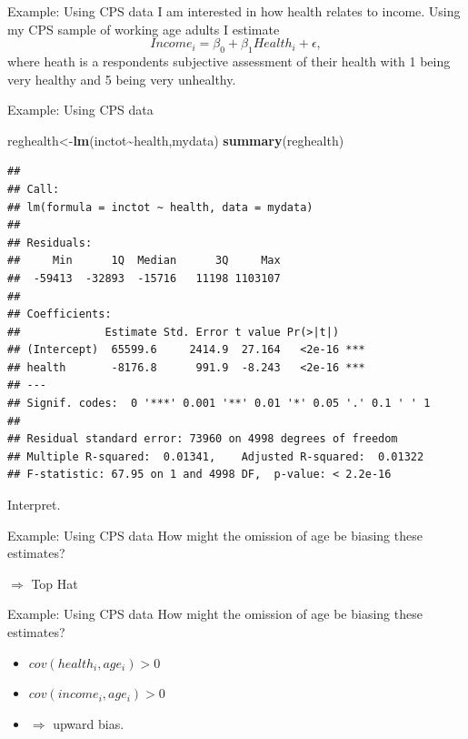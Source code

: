 \documentclass[
  ignorenonframetext,
]{beamer}
\newenvironment{Shaded}{\begin{snugshade}}{\end{snugshade}}
\newcommand{\KeywordTok}[1]{\textcolor[rgb]{0.13,0.29,0.53}{\textbf{#1}}}
\newcommand{\NormalTok}[1]{#1}
\newcommand{\OperatorTok}[1]{\textcolor[rgb]{0.81,0.36,0.00}{\textbf{#1}}}
\begin{document}
\begin{frame}{Example: Using CPS data}
\protect\hypertarget{example-using-cps-data}{}
I am interested in how health relates to income. Using my CPS sample of
working age adults I estimate \[
Income_i=\beta_0+\beta_1Health_i+\epsilon, 
\] where heath is a respondents subjective assessment of their health
with 1 being very healthy and 5 being very unhealthy.
\end{frame}

\begin{frame}[fragile]{Example: Using CPS data}
\protect\hypertarget{example-using-cps-data-1}{}
\tiny

\begin{Shaded}
\begin{Highlighting}[]
\NormalTok{reghealth\textless{}{-}}\KeywordTok{lm}\NormalTok{(inctot}\OperatorTok{\textasciitilde{}}\NormalTok{health,mydata)}
\KeywordTok{summary}\NormalTok{(reghealth)}
\end{Highlighting}
\end{Shaded}

\begin{verbatim}
## 
## Call:
## lm(formula = inctot ~ health, data = mydata)
## 
## Residuals:
##     Min      1Q  Median      3Q     Max 
##  -59413  -32893  -15716   11198 1103107 
## 
## Coefficients:
##             Estimate Std. Error t value Pr(>|t|)    
## (Intercept)  65599.6     2414.9  27.164   <2e-16 ***
## health       -8176.8      991.9  -8.243   <2e-16 ***
## ---
## Signif. codes:  0 '***' 0.001 '**' 0.01 '*' 0.05 '.' 0.1 ' ' 1
## 
## Residual standard error: 73960 on 4998 degrees of freedom
## Multiple R-squared:  0.01341,    Adjusted R-squared:  0.01322 
## F-statistic: 67.95 on 1 and 4998 DF,  p-value: < 2.2e-16
\end{verbatim}

\normalsize

Interpret.
\end{frame}

\begin{frame}{Example: Using CPS data}
\protect\hypertarget{example-using-cps-data-2}{}
How might the omission of age be biasing these estimates?

\(\Rightarrow\) Top Hat
\end{frame}

\begin{frame}{Example: Using CPS data}
\protect\hypertarget{example-using-cps-data-3}{}
How might the omission of age be biasing these estimates?

\begin{itemize}
\item
  \(cov(health_i,age_i)>0\)
\item
  \(cov(income_i,age_i)>0\)
\item
  \(\Rightarrow\) upward bias.
\end{itemize}
\end{frame}
\end{document}
